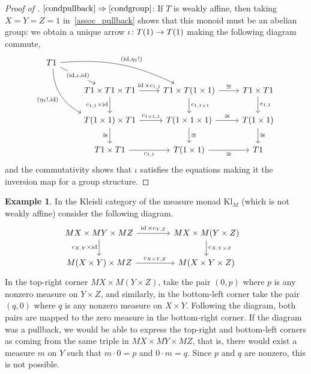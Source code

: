 \documentclass[a4paper,UKenglish,numberwithinsect,cleveref, autoref, thm-restate]{lipics-v2021}
\theoremstyle{plain} %
\theoremstyle{definition} %
\newtheorem{myexample}[mytheorem]{Example}
\begin{document}
\begin{proof}[Proof of ]
 $\ref{condpullback}\Rightarrow\ref{condgroup}$:
 If $T$ is weakly affine, then taking $X = Y = Z = 1$ in~\eqref{assoc_pullback} shows that this monoid must be an abelian group: we obtain a unique arrow $\iota \colon T(1) \to T(1)$ making the following diagram commute,
	\[
		\begin{tikzcd}
			T1 \ar{dr}[description]{(\id,\iota,\id)} \ar[bend left=15]{drr}{(\id,\eta_1 !)} \ar[bend right,swap]{ddr}{(\eta_1 !,\id)} \\
			&	T1 \times T1 \times T1 \ar{r}{\id \times c_{1,1}} \ar[swap]{d}{c_{1,1} \times \id}	& T1 \times T(1\times 1) \ar{d}{c_{1,1\times 1}} \ar{r}{\cong} & T1\times T1 \ar{d}{c_{1,1}}	\\
			&	T(1\times 1) \times T1 \ar{r}{c_{1\times 1,1}} \ar{d}[swap]{\cong}	& T(1\times 1\times 1) \ar{d}{\cong} \ar{r}{\cong} & T(1\times 1) \ar{d}{\cong} \\
			& T1\times T1 \ar{r}[swap]{c_{1,1}} & T(1\times 1) \ar{r}[swap]{\cong} & T1
		\end{tikzcd}
	\]
	and the commutativity shows that $\iota$ satisfies the equations making it the inversion map for a group structure.
\end{proof}


\begin{myexample}
 In the Kleisli category of the measure monad $\mathrm{Kl}_M$ (which is not weakly affine) consider the following diagram.
 \[
		\hspace{-9pt}	%
		\begin{tikzcd}[column sep=3.3pc]
			MX \times MY \times MZ \ar{r}{\id \times c_{Y,Z}} \ar[swap]{d}{c_{X,Y} \times \id}	& MX \times M(Y \times Z) \ar{d}{c_{X,Y \times Z}}	\\
			M(X \times Y) \times MZ \ar{r}{c_{X\times Y,Z}}						& M(X \times Y \times Z)
		\end{tikzcd}
	\]
	In the top-right corner $MX\times M(Y\times Z)$, take the pair $(0,p)$ where $p$ is any nonzero measure on $Y\times Z$, and similarly, in the bottom-left corner take the pair $(q,0)$ where $q$ is any nonzero measure on $X\times Y$. Following the diagram, both pairs are mapped to the zero measure in the bottom-right corner. If the diagram was a pullback, we would be able to express the top-right and bottom-left corners as coming from the same triple in $MX\times MY\times MZ$, that is, there would exist a measure $m$ on $Y$ such that $m\cdot 0=p$ and $0\cdot m=q$. Since $p$ and $q$ are nonzero, this is not possible.
\end{myexample}
\end{document}
